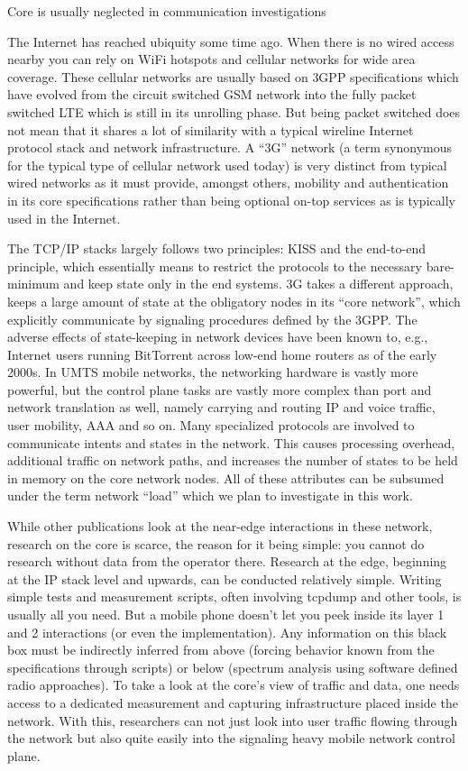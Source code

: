 Core is usually neglected in communication investigations


The Internet has reached ubiquity some time ago. When there is no wired access nearby you can rely on WiFi hotspots and cellular networks for wide area coverage. These cellular networks are usually based on \gls{3GPP} specifications which have evolved from the circuit switched \gls{GSM} network into the fully packet switched \gls{LTE} which is still in its unrolling phase. But being packet switched does not mean that it shares a lot of similarity with a typical wireline Internet protocol stack and network infrastructure. A ``3G'' network (a term synonymous for the typical type of cellular network used today) is very distinct from typical wired networks as it must provide, amongst others, mobility and authentication in its core specifications rather than being optional on-top services as is typically used in the Internet.

The TCP/IP stacks largely follows two principles: \gls{KISS} and the end-to-end principle\cite{saltzer1984end2end}, which essentially means to restrict the protocols to the necessary bare-minimum and keep state only in the end systems. 3G takes a different approach, keeps a large amount of state at the obligatory nodes in its ``core network'', which explicitly communicate by signaling procedures defined by the \gls{3GPP}.
The adverse effects of state-keeping in network devices have been known to, e.g.,  Internet users running BitTorrent across low-end home routers as of the early 2000s. In \gls{UMTS} mobile networks, the networking hardware is vastly more powerful, but the control plane tasks are vastly more complex than port and network translation as well, namely carrying and routing IP and voice traffic, user mobility, \gls{AAA} and so on. Many specialized protocols are involved to communicate intents and states in the network. This causes processing overhead, additional traffic on network paths, and increases the number of states to be held in memory on the core network nodes. All of these attributes can be subsumed under the term network ``load'' which we plan to investigate in this work.

While other publications look at the near-edge interactions in these network, research on the core is scarce, the reason for it being simple: you cannot do research without data from the operator there. Research at the edge, beginning at the IP stack level and upwards, can be conducted relatively simple. Writing simple tests and measurement scripts, often involving tcpdump and other tools, is usually all you need. But a mobile phone doesn't let you peek inside its layer 1 and 2 interactions (or even the implementation). Any information on this black box must be indirectly inferred from above (forcing behavior known from the specifications through scripts) or below (spectrum analysis using software defined radio approaches). To take a look at the core's view of traffic and data, one needs access to a dedicated measurement and capturing infrastructure placed inside the network. With this, researchers can not just look into user traffic flowing through the network but also quite easily into the signaling heavy mobile network control plane. 

